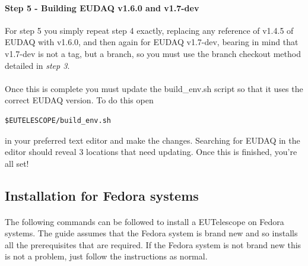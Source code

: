 \documentclass[11pt]{article}
\begin{document}
\paragraph{Step 5 - Building EUDAQ v1.6.0 and v1.7-dev}
For step 5 you simply repeat step 4 exactly, replacing any reference of v1.4.5 of EUDAQ with v1.6.0, and then again for EUDAQ v1.7-dev, bearing in mind that v1.7-dev is not a tag, but a branch, so you must use the branch checkout method detailed in \textit{step 3}. 
\paragraph{}
Once this is complete you must update the build\_env.sh script so that it uses the correct EUDAQ version. To do this open
\begin{verbatim}
$EUTELESCOPE/build_env.sh
\end{verbatim}
in your preferred text editor and make the changes. Searching for EUDAQ in the editor should reveal 3 locations that need updating. Once this is finished, you're all set!
\subsection{Installation for Fedora systems}
\paragraph{}
The following commands can be followed to install a EUTelescope on Fedora systems. The guide assumes that the Fedora system is brand new and so installs all the prerequisites that are required. If the Fedora system is not brand new this is not a problem, just follow the instructions as normal.
\end{document}
